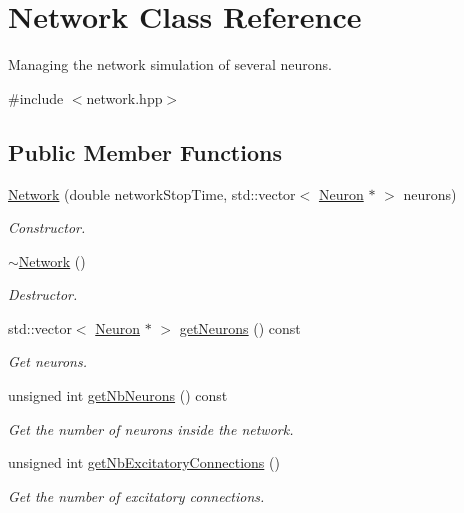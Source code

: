 \hypertarget{classNetwork}{\section{Network Class Reference}
\label{classNetwork}
}


Managing the network simulation of several neurons.  




{\ttfamily \#include $<$network.\-hpp$>$}

\subsection*{Public Member Functions}
\begin{DoxyCompactItemize}
\item 
\hyperlink{classNetwork_a8e414d020229a77d815adf91e9b9d710}{Network} (double network\-Stop\-Time, std\-::vector$<$ \hyperlink{classNeuron}{Neuron} $\ast$ $>$ neurons)
\begin{DoxyCompactList}\small\item\em Constructor. \end{DoxyCompactList}\item 
\hyperlink{classNetwork_a7a4e19cdb4bf0c7ecf82baa643831492}{$\sim$\-Network} ()
\begin{DoxyCompactList}\small\item\em Destructor. \end{DoxyCompactList}\item 
std\-::vector$<$ \hyperlink{classNeuron}{Neuron} $\ast$ $>$ \hyperlink{classNetwork_a8032b42ba5c9c445dcc0dd0a4916f633}{get\-Neurons} () const 
\begin{DoxyCompactList}\small\item\em Get neurons. \end{DoxyCompactList}\item 
unsigned int \hyperlink{classNetwork_ae803a9956ee15fe05822a3b5a5da77aa}{get\-Nb\-Neurons} () const 
\begin{DoxyCompactList}\small\item\em Get the number of neurons inside the network. \end{DoxyCompactList}\item 
unsigned int \hyperlink{classNetwork_a3dc4d1a4177641c978bede49a419e1d5}{get\-Nb\-Excitatory\-Connections} ()
\begin{DoxyCompactList}\small\item\em Get the number of excitatory connections. \end{DoxyCompactList}\item 

\end{DoxyCompactItemize}
